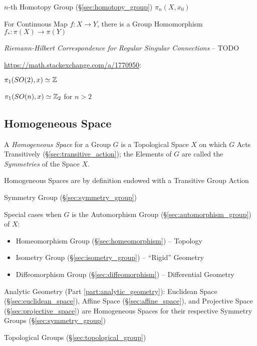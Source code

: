 $n$-th Homotopy Group (\S\ref{sec:homotopy_group}) $\pi_n(X,x_0)$

For Continuous Map $f : X \rightarrow Y$, there is a Group Homomorphism $f_* :
\pi (X) \rightarrow \pi (Y)$


\emph{Riemann-Hilbert Correspondence for Regular Singular Connections} -- TODO

\asterism

\url{https://math.stackexchange.com/a/1770950}:

$\pi_1(SO(2), x) \simeq \mathbb{Z}$

$\pi_1(SO(n), x) \simeq \mathbb{Z}_2$ for $n > 2$



\subsection{Homogeneous Space}\label{sec:homogeneous_space}

A \emph{Homogeneous Space} for a Group $G$ is a Topological Space $X$ on which
$G$ Acts Transitively (\S\ref{sec:transitive_action}); the Elements of $G$ are
called the \emph{Symmetries} of the Space $X$.

Homogeneous Spaces are by definition endowed with a Transitive Group Action

Symmetry Group (\S\ref{sec:symmetry_group})

Special cases when $G$ is the Automorphism Group
(\S\ref{sec:automorphism_group}) of $X$:
\begin{itemize}
  \item Homeomorphism Group (\S\ref{sec:homeomorphism}) -- Topology
  \item Isometry Group (\S\ref{sec:isometry_group}) -- ``Rigid'' Geometry
  \item Diffeomorphism Group (\S\ref{sec:diffeomorphism}) -- Differential
    Geometry
\end{itemize}

Analytic Geometry (Part \ref{part:analytic_geometry}): Euclidean Space
(\S\ref{sec:euclidean_space}), Affine Space (\S\ref{sec:affine_space}), and
Projective Space (\S\ref{sec:projective_space}) are Homogeneous Spaces for their
respective Symmetry Groups (\S\ref{sec:symmetry_group})

Topological Groups (\S\ref{sec:topological_group})



